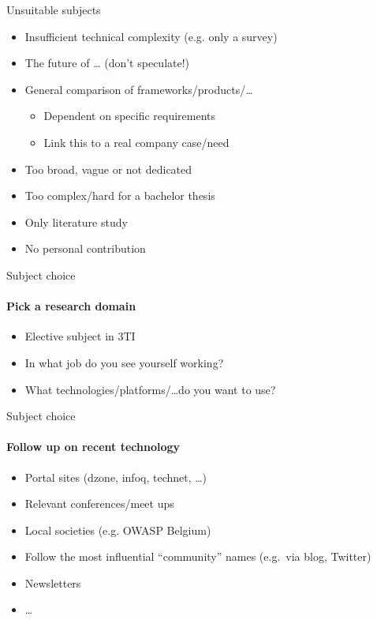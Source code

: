 \documentclass[aspectratio=169]{beamer}
\begin{document}
    \begin{frame}{Unsuitable subjects}
        
        \begin{itemize}
            \item Insufficient technical complexity (e.g. only a survey)
            \item The future of \ldots{} (don't speculate!)
            \item General comparison of frameworks/products/\ldots
            \begin{itemize}
                \item Dependent on specific requirements
                \item Link this to a real company case/need
            \end{itemize}
            \item Too broad, vague or not dedicated
            \item Too complex/hard for a bachelor thesis
            \item Only literature study
            \item No personal contribution
        \end{itemize}
        
    \end{frame}
    
    \begin{frame}{Subject choice}
        \framesubtitle{Pick a research domain}
        
        \begin{itemize}
            \item Elective subject in 3TI
            \item In what job do you see yourself working?
            \item What technologies/platforms/\ldots do you want to use?
        \end{itemize}
        
    \end{frame}
    
    \begin{frame}{Subject choice}
        \framesubtitle{Follow up on recent technology}
        
        \begin{itemize}
            \item Portal sites (dzone, infoq, technet, \ldots)
            \item Relevant conferences/meet ups
            \item Local societies (e.g. OWASP Belgium)
            \item Follow the most influential ``community'' names (e.g.\ via blog, Twitter)            
            \item Newsletters
            \item \ldots
        \end{itemize}
        
    \end{frame}
    
\end{document}
